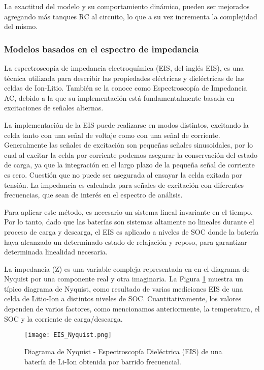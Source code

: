 \noindent La exactitud del modelo y su comportamiento din\'amico, pueden ser 
mejorados agregando m\'as tanques RC al circuito, lo que a su vez incrementa la
complejidad del mismo. 

\subsubsection{Modelos basados en el espectro de impedancia}

La espectroscopía de impedancia electroquímica (\acrshort{EIS}, del ingl\'es
\acrlong{EIS}), es una técnica utilizada para describir las propiedades
eléctricas y dieléctricas de las celdas de Ion-Litio. También se la conoce como
Espectroscopía de Impedancia AC, debido a la que su implementación está
fundamentalmente basada en excitaciones de señales alternas.

La implementación de la EIS puede realizarse en modos distintos, excitando la
celda tanto con una señal de voltaje como con una señal de corriente.
Generalmente las señales de excitación son pequeñas señales sinusoidales, por lo
cual al excitar la celda por corriente podemos asegurar la conservación del
estado de carga, ya que la integración en el largo plazo de la pequeña señal de
corriente es cero. Cuesti\'on que no puede ser asegurada al ensayar la celda
exitada por tensión. La impedancia es calculada para señales de excitación con
diferentes frecuencias, que sean de interés en el espectro de análisis.

Para aplicar este m\'etodo, es necesario un sistema lineal invariante en el
tiempo. Por lo tanto, dado que las bater\'ias son sistemas altamente no lineales
durante el proceso de carga y descarga, el \acrshort{EIS} es aplicado a niveles
de \acrshort{SOC} donde la bater\'ia haya alcanzado un determinado estado de
relajación y reposo, para garantizar determinada linealidad necesaria.

\noindent La impedancia (Z) es una variable compleja representada en en el 
diagrama de Nyquist por una componente real y otra imaginaria. 
La Figura \ref{EIS_Nyquist} muestra un t\'ipico diagrama de Nyquist, 
como resultado de varias mediciones \acrshort{EIS} de una celda de Litio-Ion a
distintos niveles de \acrshort{SOC}. Cuantitativamente, los valores dependen de 
varios factores, como mencionamos anteriormente, la temperatura, 
el \acrshort{SOC} y la corriente de carga/descarga.

\begin{figure}[h!]
    \begin{center}
	\texttt{[image: EIS\_Nyquist.png]}
	\caption{Diagrama de Nyquist - Espectroscopía Dieléctrica (EIS) de 
	una batería de Li-Ion obtenida por barrido frecuencial.}
	\label{EIS_Nyquist}
    \end{center}
\end{figure}
\FloatBarrier

